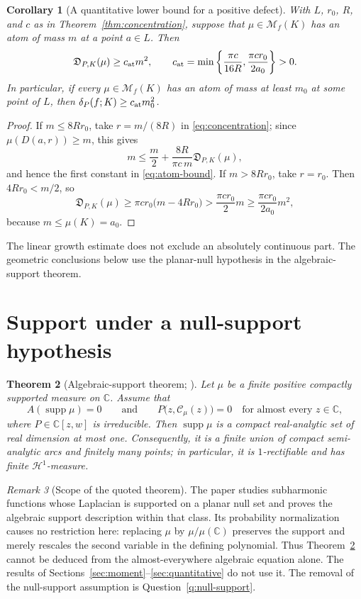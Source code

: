 \documentclass[reqno]{amsart}
\newtheorem{theorem}{Theorem}[section]
\newtheorem{corollary}[theorem]{Corollary}
\theoremstyle{definition}
\theoremstyle{remark}
\newtheorem{remark}[theorem]{Remark}
\newcommand{\bC}{\mathbb C}
\newcommand{\M}{\mathcal M}
\newcommand{\Cauchy}{\mathcal C}
\newcommand{\supp}{\operatorname{supp}}
\newcommand{\Hone}{\mathcal H^1}
\begin{document}
\begin{corollary}[A quantitative lower bound for a positive defect]
\label{cor:atom-bound}
With $L$, $r_0$, $R$, and $c$ as in
Theorem~\ref{thm:concentration}, suppose that $\mu\in\M_f(K)$ has an atom of
mass $m$ at a point $a\in L$.  Then
\begin{equation}\label{eq:atom-bound}
 \mathfrak D_{P,K}(\mu)\ge c_{\rm at}m^2,
 \qquad
 c_{\rm at}
 =\min\left\{\frac{\pi c}{16R},\frac{\pi c r_0}{2a_0}\right\}>0.
\end{equation}
In particular, if every $\mu\in\M_f(K)$ has an atom of mass at least $m_0$ at
some point of $L$, then $\delta_P(f;K)\ge c_{\rm at}m_0^2$.
\end{corollary}

\begin{proof}
If $m\le8Rr_0$, take $r=m/(8R)$ in \eqref{eq:concentration}; since
$\mu(D(a,r))\ge m$, this gives
\[
 m\le\frac m2+\frac{8R}{\pi c\,m}\mathfrak D_{P,K}(\mu),
\]
and hence the first constant in \eqref{eq:atom-bound}.  If $m>8Rr_0$, take
$r=r_0$.  Then $4Rr_0<m/2$, so
\[
 \mathfrak D_{P,K}(\mu)
 \ge \pi c r_0\bigl(m-4Rr_0\bigr)
 >\frac{\pi c r_0}{2}m
 \ge\frac{\pi c r_0}{2a_0}m^2,
\]
because $m\le\mu(K)=a_0$.
\end{proof}

The linear growth estimate does not exclude an absolutely continuous part.
The geometric conclusions below use the planar-null hypothesis in the
algebraic-support theorem.

\section{Support under a null-support hypothesis}
\label{sec:support}

\begin{theorem}[Algebraic-support theorem; {\cite{BBB}}]
\label{thm:external-support}
Let $\mu$ be a finite positive compactly supported measure on $\bC$.  Assume
that
\[
 A(\supp\mu)=0
 \qquad\text{and}\qquad
 P\bigl(z,\Cauchy_\mu(z)\bigr)=0
 \quad\text{for almost every }z\in\bC,
\]
where $P\in\bC[z,w]$ is irreducible.  Then $\supp\mu$ is a compact
real-analytic set of real dimension at most one.  Consequently, it is a finite
union of compact semi-analytic arcs and finitely many points; in particular, it
is $1$-rectifiable and has finite
$\Hone$-measure.
\end{theorem}

\begin{remark}[Scope of the quoted theorem]
The paper \cite{BBB} studies subharmonic functions whose Laplacian is supported
on a planar null set and proves the algebraic support description within that
class.  Its probability normalization causes no restriction here: replacing
$\mu$ by $\mu/\mu(\bC)$ preserves the support and merely rescales the second
variable in the defining polynomial.  Thus Theorem~\ref{thm:external-support}
cannot be deduced from the almost-everywhere algebraic equation alone.  The results of
Sections~\ref{sec:moment}--\ref{sec:quantitative} do not use it.  The removal of
the null-support assumption is Question~\ref{q:null-support}.
\end{remark}
\end{document}
